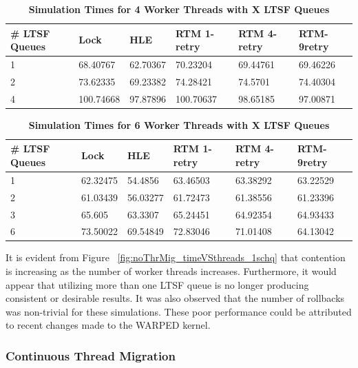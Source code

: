 \documentclass[a4paper]{article}
\begin{document}
\begin{table}[H]
    \centering
    \begin{tabular}{l|p{2cm}|p{2cm}|p{2cm}|p{2cm}|p{2cm}}
        \textbf{\# LTSF Queues}&Lock &HLE &RTM 1-retry &RTM 4-retry &RTM-9retry \\
        \hline
        \midrule
            1 &68.40767  &62.70367 &70.23204  &69.44761 &69.46226 \\ 
            2 &73.62335  &69.23382 &74.28421  &74.5701  &74.40304 \\
            4 &100.74668 &97.87896 &100.70637 &98.65185 &97.00871 
    \end{tabular}
    \caption{\textbf{Simulation Times for 4 Worker Threads with X LTSF Queues}}
    \label{tab:noThrMig_4threadsXschq}
\end{table}

\begin{table}[H]
    \centering
    \begin{tabular}{l|p{2cm}|p{2cm}|p{2cm}|p{2cm}|p{2cm}}
        \textbf{\# LTSF Queues}&Lock &HLE &RTM 1-retry &RTM 4-retry &RTM-9retry \\
        \hline
        \midrule
            1 &62.32475 &54.4856  &63.46503 &63.38292 &63.22529 \\  
            2 &61.03439 &56.03277 &61.72473 &61.38556 &61.23396 \\  
            3 &65.605   &63.3307  &65.24451 &64.92354 &64.93433 \\  
            6 &73.50022 &69.54849 &72.83046 &71.01408 &64.13042   
    \end{tabular}
    \caption{\textbf{Simulation Times for 6 Worker Threads with X LTSF Queues}}
    \label{tab:noThrMig_6threadsXschq}
\end{table}

It is evident from Figure ~\ref{fig:noThrMig_timeVSthreads_1schq} that
contention is increasing as the number of worker threads increases.
Furthermore, it would appear that utilizing more than one LTSF queue is no
longer producing consistent or desirable results. It was also observed that the
number of rollbacks was non-trivial for these simulations.  These poor
performance could be attributed to recent changes made to the WARPED kernel.\par

\subsubsection{\textbf{Continuous Thread Migration}}
\end{document}
